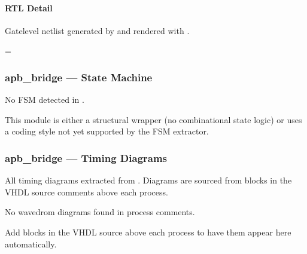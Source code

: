 \documentclass[letterpaper,10pt,english]{sphinxmanual}
\begin{document}
\paragraph{RTL Detail}
\label{\detokenize{modules/apb_bridge/block:rtl-detail}}
\sphinxAtStartPar
Gate\sphinxhyphen{}level netlist generated by  and rendered with .

\begin{landscape}
\makeatletter
\spx@image@maxheight=\dimexpr{}\baselineskip\relax
\makeatother


\end{landscape}

\sphinxstepscope


\subsubsection{apb\_bridge — State Machine}
\label{\detokenize{modules/apb_bridge/fsm:apb-bridge-state-machine}}\label{\detokenize{modules/apb_bridge/fsm::doc}}
\sphinxAtStartPar
No FSM detected in .

\sphinxAtStartPar
This module is either a structural wrapper (no combinational
state logic) or uses a coding style not yet supported by the
FSM extractor.

\sphinxstepscope


\subsubsection{apb\_bridge — Timing Diagrams}
\label{\detokenize{modules/apb_bridge/timing:apb-bridge-timing-diagrams}}\label{\detokenize{modules/apb_bridge/timing::doc}}
\sphinxAtStartPar
All timing diagrams extracted from .
Diagrams are sourced from  blocks in the VHDL
source comments above each process.

\sphinxAtStartPar
No wavedrom diagrams found in process comments.

\sphinxAtStartPar
Add  blocks in the VHDL source above each
process to have them appear here automatically.

\sphinxstepscope
\end{document}

